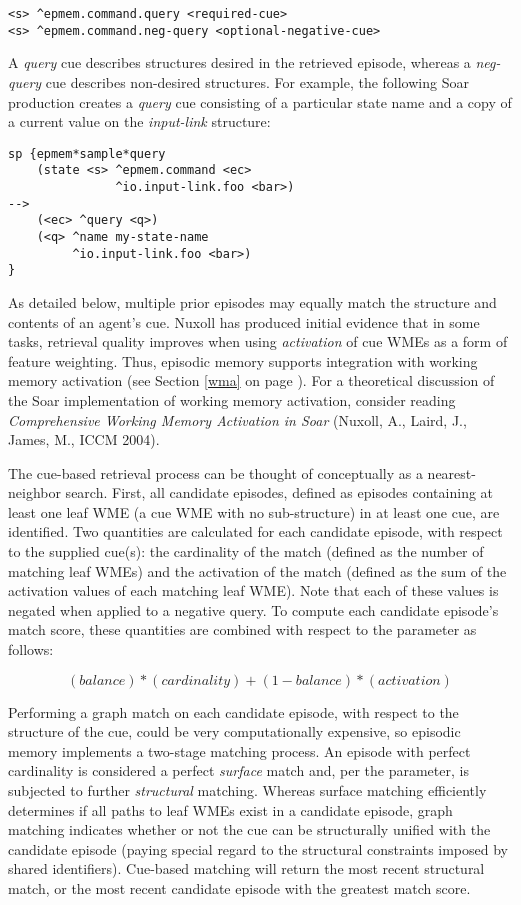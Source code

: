 \begin{verbatim}
<s> ^epmem.command.query <required-cue>
<s> ^epmem.command.neg-query <optional-negative-cue>
\end{verbatim}

A \emph{query} cue describes structures desired in the retrieved episode, whereas a \emph{neg-query} cue describes non-desired structures.  
For example, the following Soar production creates a \emph{query} cue consisting of a particular state name and a copy of a current value on the \emph{input-link} structure:

\begin{verbatim}
sp {epmem*sample*query
    (state <s> ^epmem.command <ec>
               ^io.input-link.foo <bar>)
-->
    (<ec> ^query <q>)
    (<q> ^name my-state-name
         ^io.input-link.foo <bar>)
}
\end{verbatim}

As detailed below, multiple prior episodes may equally match the structure and contents of an agent's cue. 
Nuxoll has produced initial evidence that in some tasks, retrieval quality improves when using \emph{activation} of cue WMEs as a form of feature weighting.  
Thus, episodic memory supports integration with working memory activation (see Section \ref{wma} on page \pageref{wma}).  
For a theoretical discussion of the Soar implementation of working memory activation, consider reading \emph{Comprehensive Working Memory Activation in Soar} (Nuxoll, A., Laird, J., James, M., ICCM 2004).

The cue-based retrieval process can be thought of conceptually as a nearest-neighbor search. 
First, all candidate episodes, defined as episodes containing at least one leaf WME (a cue WME with no sub-structure) in at least one cue, are identified.  
Two quantities are calculated for each candidate episode, with respect to the supplied cue(s): the cardinality of the match (defined as the number of matching leaf WMEs) and the activation of the match (defined as the sum of the activation values of each matching leaf WME).  
Note that each of these values is negated when applied to a negative query.  
To compute each candidate episode's match score, these quantities are combined with respect to the  parameter as follows:

$$(balance)*(cardinality) + (1-balance)*(activation)$$

Performing a graph match on each candidate episode, with respect to the structure of the cue, could be very computationally expensive, so episodic memory implements a two-stage matching process.
An episode with perfect cardinality is considered a perfect \emph{surface} match and, per the  parameter, is subjected to further \emph{structural} matching.  
Whereas surface matching efficiently determines if all paths to leaf WMEs exist in a candidate episode, graph matching indicates whether or not the cue can be structurally unified with the candidate episode (paying special regard to the structural constraints imposed by shared identifiers).  
Cue-based matching will return the most recent structural match, or the most recent candidate episode with the greatest match score.

